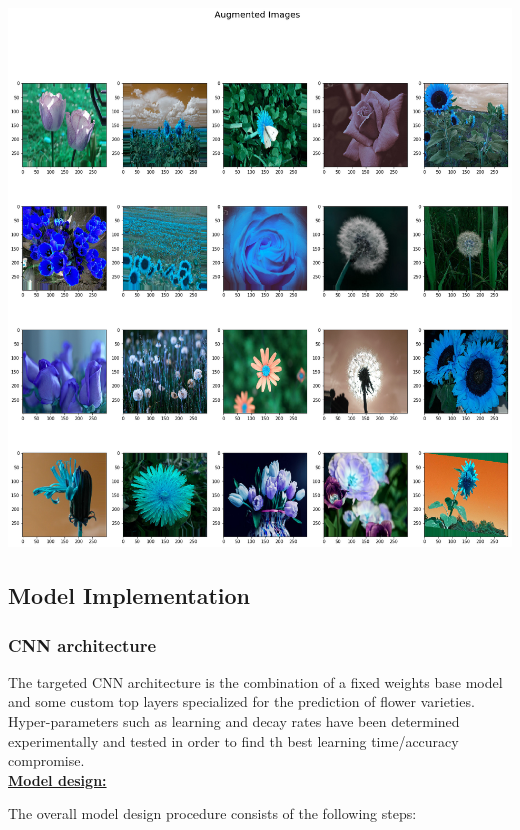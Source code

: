 \begin{center}
	\includegraphics[scale=.3]{./sections/03_methodology/output_26_0.png}
\end{center}

\subsection{Model Implementation}

\subsubsection{CNN architecture}

The targeted CNN architecture is the combination of a fixed weights base model and some custom top layers specialized for the prediction of flower varieties. Hyper-parameters such as learning and decay rates have been determined experimentally and tested in order to find th best learning time/accuracy compromise. 
\\

\underline{\textbf{Model design:}}

The overall model design procedure consists of the following steps:

